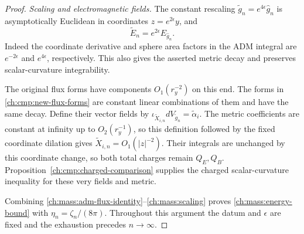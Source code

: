 \begin{proof}
\emph{Scaling and electromagnetic fields.}
The constant rescaling $\widetilde g_n=e^{4\epsilon}\hat g_n$ is
asymptotically Euclidean in coordinates $z=e^{2\epsilon}y$, and
\begin{equation}\label{ch:mass:scaling}
 \widetilde E_n=e^{2\epsilon}E_{\hat g_n}.
\end{equation}
Indeed the coordinate derivative and sphere area factors in the ADM
integral are $e^{-2\epsilon}$ and $e^{4\epsilon}$, respectively.
This also gives the asserted metric decay and preserves scalar-curvature
integrability.

The original flux forms have components $O_1(r_y^{-2})$ on this end.
The forms in \eqref{ch:cmp:new-flux-forms} are constant linear
combinations of them and have the same decay. Define their vector
fields by $\iota_{\widetilde X_{i,n}}dV_{\widetilde g_n}
=\widetilde\alpha_i$. The metric coefficients are constant at
infinity up to $O_2(r_y^{-1})$, so this definition followed by the
fixed coordinate dilation gives
$\widetilde X_{i,n}=O_1(|z|^{-2})$. Their integrals are unchanged
by this coordinate change, so both total charges remain $Q_E,Q_B$.
Proposition~\ref{ch:cmp:charged-comparison} supplies the charged
scalar-curvature inequality for these very fields and metric.

Combining \eqref{ch:mass:adm-flux-identity}--\eqref{ch:mass:scaling}
proves \eqref{ch:mass:energy-bound} with
$\eta_n=\zeta_n/(8\pi)$. Throughout this argument the datum and
$\epsilon$ are fixed and the exhaustion precedes $n\to\infty$.
\end{proof}
